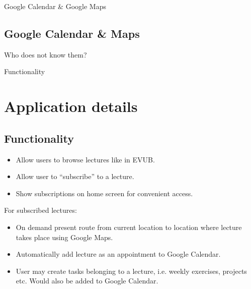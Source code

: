 \documentclass{beamer}
\begin{document}
\begin{frame}{Google Calendar \& Google Maps}
	\subsection{Google Calendar \& Maps}
	Who does not know them?
\end{frame}

\begin{frame}{Functionality}
	\section{Application details}
	\subsection{Functionality}
	\begin{itemize}
		\item Allow users to browse lectures like in EVUB.
		\item Allow user to ``subscribe'' to a lecture.
		\item Show subscriptions on home screen for convenient access.
	\end{itemize}

	For subscribed lectures:
	\begin{itemize}
		\item On demand present route from current location to location where lecture takes place using Google Maps.
		\item Automatically add lecture as an appointment to Google Calendar.
		\item User may create tasks belonging to a lecture, i.e. weekly exercises, projects etc. Would also be added to Google Calendar.
	\end{itemize}
	
\end{frame}
\end{document}
